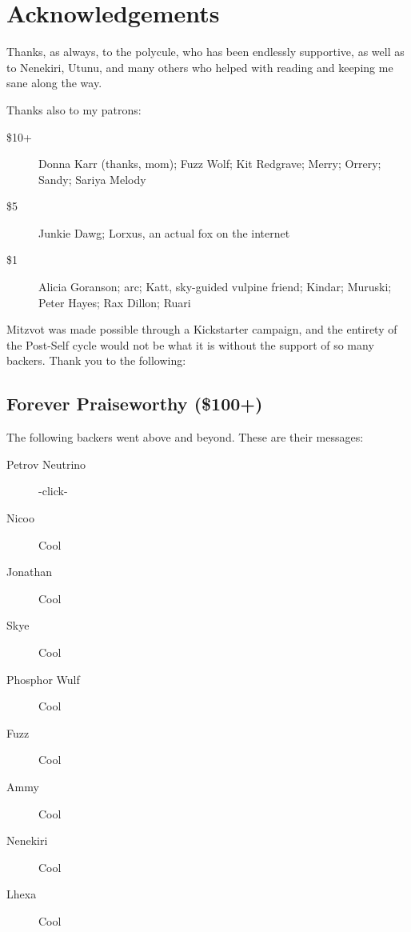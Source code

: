 \chapter*{Acknowledgements}

Thanks, as always, to the polycule, who has been endlessly supportive, as well as to Nenekiri, Utunu, and many others who helped with reading and keeping me sane along the way.

Thanks also to my patrons:

\begin{description}
    \item[\$10+]
    Donna Karr (thanks, mom); Fuzz Wolf; Kit Redgrave; Merry; Orrery; Sandy; Sariya Melody

    \item[\$5]
    Junkie Dawg; Lorxus, an actual fox on the internet

    \item[\$1]
    Alicia Goranson; arc; Katt, sky-guided vulpine friend; Kindar; Muruski; Peter Hayes; Rax Dillon; Ruari
\end{description}

Mitzvot was made possible through a Kickstarter campaign, and the entirety of the Post-Self cycle would not be what it is without the support of so many backers. Thank you to the following:

\section*{Forever Praiseworthy (\$100+)}

The following backers went above and beyond. These are their messages:

\begin{description}
  \item[Petrov Neutrino]
  -click-

  \item[Nicoo]
  Cool

  \item[Jonathan]
  Cool

  \item[Skye]
  Cool
  
  \item[Phosphor Wulf]
  Cool

  \item[Fuzz]
  Cool

  \item[Ammy]
  Cool

  \item[Nenekiri]
  Cool

  \item[Lhexa]
  Cool
\end{description}

